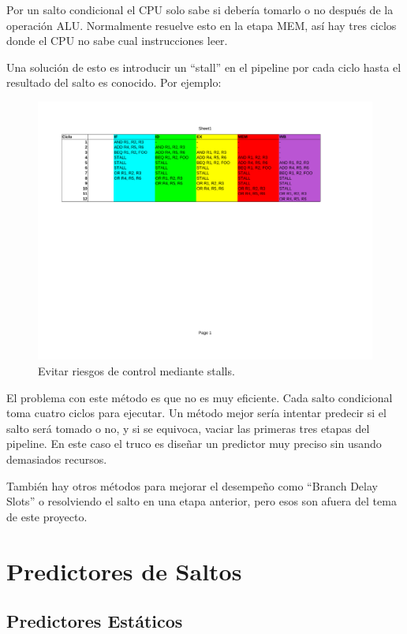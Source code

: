 \documentclass[a4paper]{article}
\begin{document}
Por un salto condicional el CPU solo sabe si debería tomarlo o no después de la operación ALU. Normalmente resuelve esto en la etapa MEM, así hay tres ciclos donde el CPU no sabe cual instrucciones leer.

Una solución de esto es introducir un ``stall'' en el pipeline por cada ciclo hasta el resultado del salto es conocido. Por ejemplo:

\begin{figure}[!htb]
\centering
\includegraphics[scale=0.4]{./img/always_stall}
\caption{Evitar riesgos de control mediante stalls.}
\label{fig:always_stall}
\end{figure}

El problema con este método es que no es muy eficiente. Cada salto condicional toma cuatro ciclos para ejecutar. Un método mejor sería intentar predecir si el salto será tomado o no, y si se equivoca, vaciar las primeras tres etapas del pipeline. En este caso el truco es diseñar un predictor muy preciso sin usando demasiados recursos.

También hay otros métodos para mejorar el desempeño como ``Branch Delay Slots'' o resolviendo el salto en una etapa anterior, pero esos son afuera del tema de este proyecto.

\section{Predictores de Saltos}
\subsection{Predictores Estáticos}
\end{document}
